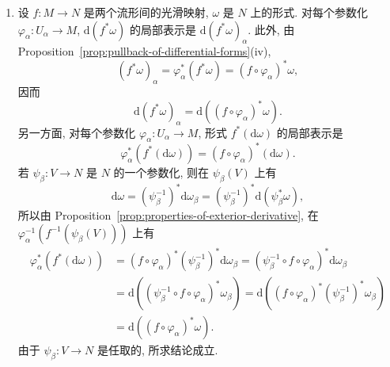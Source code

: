 \begin{description}[font=\normalfont,leftmargin=2em,labelwidth=1.5em]
\begin{enumerate}[label=(\roman*),ref=\roman*,leftmargin=*]
\item 设 $f:M\to N$ 是两个流形间的光滑映射, $\omega$ 是 $N$ 上的形式. 对每个参数化 $\varphi_\alpha:U_\alpha\to M$, $\mathrm{d}(f^*\omega)$ 的局部表示是 $\mathrm{d}(f^*\omega)_\alpha$. 此外, 由 Proposition~\ref{prop:pullback-of-differential-forms}(iv),
\[
  (f^*\omega)_\alpha=\varphi_\alpha^*(f^*\omega)=(f\circ\varphi_\alpha)^*\omega,
\]
因而
\[
  \mathrm{d}(f^*\omega)_\alpha=\mathrm{d}((f\circ\varphi_\alpha)^*\omega).
\]
另一方面, 对每个参数化 $\varphi_\alpha:U_\alpha\to M$, 形式 $f^*(\mathrm{d}\omega)$ 的局部表示是
\[
  \varphi_\alpha^*(f^*(\mathrm{d}\omega))=(f\circ\varphi_\alpha)^*(\mathrm{d}\omega).
\]
若 $\psi_\beta:V\to N$ 是 $N$ 的一个参数化, 则在 $\psi_\beta(V)$ 上有
\[
  \mathrm{d}\omega=(\psi_\beta^{-1})^*\mathrm{d}\omega_\beta
  =(\psi_\beta^{-1})^*\mathrm{d}(\psi_\beta^*\omega),
\]
所以由 Proposition~\ref{prop:properties-of-exterior-derivative}, 在 $\varphi_\alpha^{-1}(f^{-1}(\psi_\beta(V)))$ 上有
\begin{align*}
  \varphi_\alpha^*(f^*(\mathrm{d}\omega))
  &=(f\circ\varphi_\alpha)^*(\psi_\beta^{-1})^*\mathrm{d}\omega_\beta
  =(\psi_\beta^{-1}\circ f\circ\varphi_\alpha)^*\mathrm{d}\omega_\beta\\
  &=\mathrm{d}((\psi_\beta^{-1}\circ f\circ\varphi_\alpha)^*\omega_\beta)
  =\mathrm{d}((f\circ\varphi_\alpha)^*(\psi_\beta^{-1})^*\omega_\beta)\\
  &=\mathrm{d}((f\circ\varphi_\alpha)^*\omega).
\end{align*}
由于 $\psi_\beta:V\to N$ 是任取的, 所求结论成立.
\end{enumerate}


\end{description}

